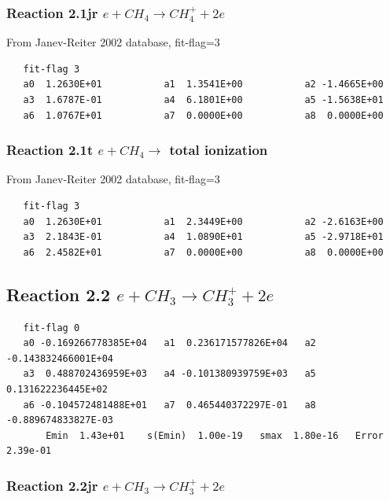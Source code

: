 \documentclass[12pt,dvipdfmx]{article}
\begin{document}
\subsubsection{
Reaction 2.1jr  $e + CH_4 \rightarrow CH_4^+ + 2e $
}

From Janev-Reiter 2002 database, fit-flag=3

\begin{small}\begin{verbatim}
   fit-flag 3
   a0  1.2630E+01           a1  1.3541E+00           a2 -1.4665E+00
   a3  1.6787E-01           a4  6.1801E+00           a5 -1.5638E+01
   a6  1.0767E+01           a7  0.0000E+00           a8  0.0000E+00

\end{verbatim}\end{small}


\subsubsection{
Reaction 2.1t  $e + CH_{4} \rightarrow$ total ionization
}

From Janev-Reiter 2002 database, fit-flag=3
\begin{small}\begin{verbatim}
   fit-flag 3
   a0  1.2630E+01           a1  2.3449E+00           a2 -2.6163E+00
   a3  2.1843E-01           a4  1.0890E+01           a5 -2.9718E+01
   a6  2.4582E+01           a7  0.0000E+00           a8  0.0000E+00
\end{verbatim}\end{small}

\subsection{
Reaction 2.2  $e + CH_3 \rightarrow CH_3^+ + 2e $
}

\begin{small}\begin{verbatim}
   fit-flag 0
   a0 -0.169266778385E+04   a1  0.236171577826E+04   a2 -0.143832466001E+04
   a3  0.488702436959E+03   a4 -0.101380939759E+03   a5  0.131622236445E+02
   a6 -0.104572481488E+01   a7  0.465440372297E-01   a8 -0.889674833827E-03
       Emin  1.43e+01    s(Emin)  1.00e-19   smax  1.80e-16   Error  2.39e-01
\end{verbatim}\end{small}


\subsubsection{
Reaction 2.2jr  $e + CH_{3} \rightarrow CH_{3}^{+} + 2e $
}
\end{document}
